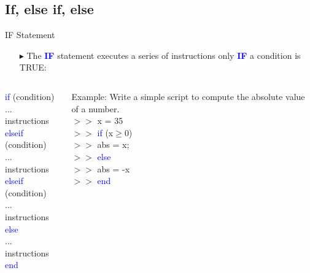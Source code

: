 \documentclass[xcolor={dvipsnames,rgb}, aspectratio=169]{beamer}
\begin{document}
\subsection{If, else if, else}
\begin{frame}{IF Statement}
\begin{itemize}
   \item[$\blacktriangleright$] The \textcolor{blue}{\textbf{IF}} statement executes a
      series of instructions only \textcolor{blue}{\textbf{IF}} a condition is TRUE:
\end{itemize}

\begin{columns}
   \begin{tcolorbox}[colback=white,colframe=bluepoli]
      \textcolor{blue}{if} (condition)\\
      ... instructions\\
      \textcolor{blue}{elseif} (condition)\\
      ... instructions \\
      \textcolor{blue}{elseif} (condition)\\
      ... instructions \\
      \textcolor{blue}{else}\\
      ... instructions \\
      \textcolor{blue}{end}
   \end{tcolorbox}
   \begin{tcolorbox}[colback=white,colframe=bluepoli]
      \textcolor{mylilas}{Example: Write a simple script to compute the absolute value of
      a number.}\\
      $>>$ x = 35\\
      $>>$ \textcolor{blue}{if} (x$\ge$0)\\
      $>>$ \hspace{1em}abs = x;\\
      $>>$ \textcolor{blue}{else}\\
      $>>$ \hspace{1em}abs = -x\\
      $>>$ \textcolor{blue}{end}
   \end{tcolorbox}
\end{columns}
\end{frame}
\end{document}
